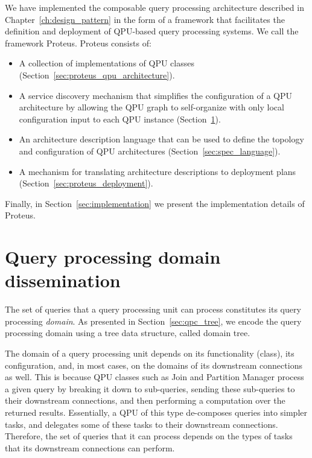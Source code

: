 We have implemented the composable query processing architecture described in Chapter~\ref{ch:design_pattern} in the form
of a framework that facilitates the definition and deployment of QPU-based query processing systems.
We call the framework Proteus.
Proteus consists of:

\begin{itemize}
  \item A collection of implementations of QPU classes (Section~\ref{sec:proteus_qpu_architecture}).

  \item A service discovery mechanism that simplifies the configuration of a QPU architecture by allowing the QPU graph to self-organize
  with only local configuration input to each QPU instance (Section~\ref{sec:domain_dissemination}).

  \item An architecture description language that can be used to define the topology and configuration of QPU architectures
  (Section~\ref{sec:spec_language}).

  \item A mechanism for translating architecture descriptions to deployment plans (Section~\ref{sec:proteus_deployment}).
\end{itemize}

Finally, in Section~\ref{sec:implementation} we present the implementation details of Proteus.


\section{Query processing domain dissemination}
\label{sec:domain_dissemination}
The set of queries that a query processing unit can process constitutes its query processing \textit{domain}.
As presented in Section~\ref{sec:qpc_tree},
we encode the query processing domain using a tree data structure, called domain tree.

The domain of a query processing unit depends on its functionality (class), its configuration, and, in most cases,
on the domains of its downstream connections as well.
This is because QPU classes such as Join and Partition Manager process a given query by breaking it down to sub-queries,
sending these sub-queries to their downstream connections,
and then performing a computation over the returned results.
Essentially, a QPU of this type de-composes queries into simpler tasks, and delegates some of these tasks to their downstream connections.
Therefore, the set of queries that it can process depends on the types of tasks that its downstream connections can perform.

